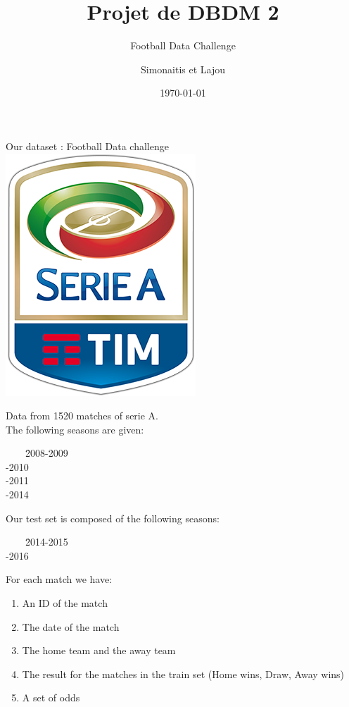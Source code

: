 \documentclass[french]{beamer}
\title{Projet de DBDM 2}
\subtitle{Football Data Challenge}
\author{Simonaitis et Lajou}
\date{\today}
\begin{document}
\begin{frame}
	\maketitle
\end{frame}

\begin{frame}
	\begin{center}
		Our dataset : Football Data challenge
		\includegraphics[scale=0.5]{LegaSerieAlogoTIM.png}
	\end{center}
\end{frame}

\begin{frame}
	Data from 1520 matches of serie A.\\
	The following seasons are given:\\
	\begin{tabbing}
	~~~~\= 2008-2009\\
	-2010\\
	-2011\\
	-2014\\
	\end{tabbing}
	Our test set is composed of the following seasons:\\
	\begin{tabbing}
	~~~~\= 2014-2015\\
	-2016\\
	\end{tabbing}
\end{frame}


\begin{frame}
	For each match we have:
	\begin{enumerate}
		\item An ID of the match
		\item The date of the match
		\item The home team and the away team
		\item The result for the matches in the train set (Home wins, Draw, Away wins)
		\item A set of odds
	\end{enumerate}
\end{frame}
\end{document}
